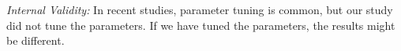 \emph{Internal Validity: }
In recent studies, parameter tuning is common, but our study did not tune the parameters. If we have tuned the parameters, the results might be different.
\clearpage
